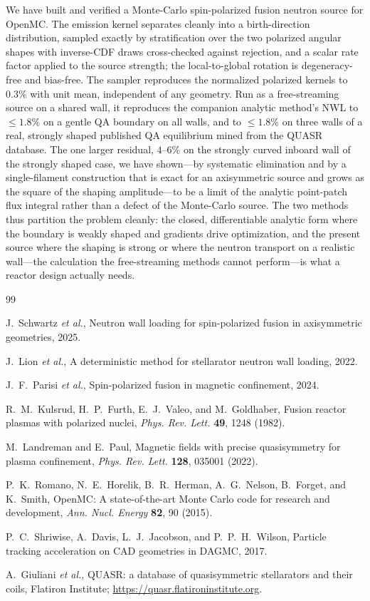 \documentclass[11pt]{article}
\begin{document}
We have built and verified a Monte-Carlo spin-polarized fusion neutron source for OpenMC.
The emission kernel separates cleanly into a birth-direction distribution, sampled exactly
by stratification over the two polarized angular shapes with inverse-CDF draws
cross-checked against rejection, and a scalar rate factor applied to the source strength;
the local-to-global rotation is degeneracy-free and bias-free. The sampler reproduces the
normalized polarized kernels to $0.3\%$ with unit mean, independent of any geometry. Run
as a free-streaming source on a shared wall, it reproduces the companion analytic method's
NWL to $\le1.8\%$ on a gentle QA boundary on all walls, and to $\le1.8\%$ on three walls of
a real, strongly shaped published QA equilibrium mined from the QUASR database. The one
larger residual, $4$--$6\%$ on the strongly curved inboard wall of the strongly shaped
case, we have shown---by systematic elimination and by a single-filament construction that
is exact for an axisymmetric source and grows as the square of the shaping amplitude---to
be a limit of the analytic point-patch flux integral rather than a defect of the
Monte-Carlo source. The two methods thus partition the problem cleanly: the closed,
differentiable analytic form where the boundary is weakly shaped and gradients drive
optimization, and the present source where the shaping is strong or where the neutron
transport on a realistic wall---the calculation the free-streaming methods cannot
perform---is what a reactor design actually needs.

\begin{thebibliography}{99}

J.~Schwartz \emph{et al.}, Neutron wall loading for spin-polarized fusion in axisymmetric
geometries, 2025.

J.~Lion \emph{et al.}, A deterministic method for stellarator neutron wall loading, 2022.

J.~F.~Parisi \emph{et al.}, Spin-polarized fusion in magnetic confinement, 2024.

R.~M.~Kulsrud, H.~P.~Furth, E.~J.~Valeo, and M.~Goldhaber,
Fusion reactor plasmas with polarized nuclei,
\emph{Phys. Rev. Lett.} \textbf{49}, 1248 (1982).

M.~Landreman and E.~Paul, Magnetic fields with precise quasisymmetry for plasma
confinement, \emph{Phys. Rev. Lett.} \textbf{128}, 035001 (2022).

P.~K.~Romano, N.~E.~Horelik, B.~R.~Herman, A.~G.~Nelson, B.~Forget, and K.~Smith,
OpenMC: A state-of-the-art Monte Carlo code for research and development,
\emph{Ann. Nucl. Energy} \textbf{82}, 90 (2015).

P.~C.~Shriwise, A.~Davis, L.~J.~Jacobson, and P.~P.~H.~Wilson,
Particle tracking acceleration on CAD geometries in DAGMC, 2017.

A.~Giuliani \emph{et al.}, QUASR: a database of quasisymmetric stellarators and their
coils, Flatiron Institute; \url{https://quasr.flatironinstitute.org}.

\end{thebibliography}
\end{document}
